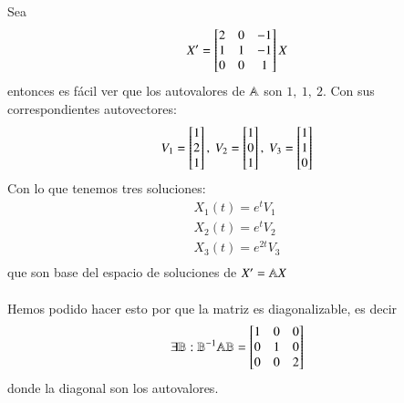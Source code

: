 \begin{eg}
    Sea
    $$
        X' = \mx{2 & 0 & -1 \\ 1 & 1 & -1 \\ 0 & 0 & 1} X
    $$
    entonces es fácil ver que los autovalores de $\mathbb{A}$ son $1,\ 1,\ 2$. Con sus correspondientes autovectores:
    $$
        V_1 = \mx{1 \\ 2 \\ 1},\ V_2 = \mx{1\\0\\1},\ V_3 = \mx{1\\1\\0}
    $$
    Con lo que tenemos tres soluciones:
    \begin{gather*}
        X_1(t) = e^t V_1\\
        X_2(t) = e^t V_2\\
        X_3(t) = e^{2t} V_3\\
    \end{gather*}
    que son base del espacio de soluciones de $X' = \mathbb{A} X$\\\\
    Hemos podido hacer esto por que la matriz es diagonalizable, es decir
    $$
        \exists \B : \B^{-1}\A\B = \mx{1&0&0\\0&1&0\\0&0&2}
    $$
    donde la diagonal son los autovalores.
\end{eg}
